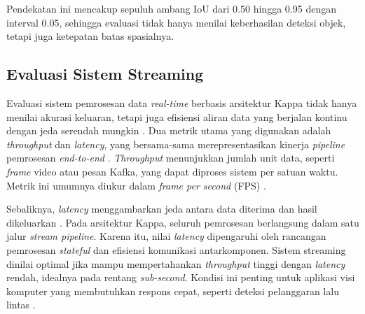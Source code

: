 Pendekatan ini mencakup sepuluh ambang IoU dari 0{.}50 hingga 0{.}95 dengan
interval 0{.}05, sehingga evaluasi tidak hanya menilai keberhasilan deteksi
objek, tetapi juga ketepatan batas spasialnya.
\subsection{Evaluasi Sistem Streaming}

Evaluasi sistem pemrosesan data \textit{real-time} berbasis arsitektur Kappa
tidak hanya menilai akurasi keluaran, tetapi juga efisiensi aliran data yang
berjalan kontinu dengan jeda serendah mungkin
\cite{kreps2014questioning}. Dua metrik utama yang digunakan adalah
\textit{throughput} dan \textit{latency}, yang bersama-sama merepresentasikan
kinerja \textit{pipeline} pemrosesan \textit{end-to-end}
\cite{kleppmann2017designing}. \textit{Throughput} menunjukkan jumlah unit
data, seperti \textit{frame} video atau pesan Kafka, yang dapat diproses
sistem per satuan waktu. Metrik ini umumnya diukur dalam
\textit{frame per second} (FPS) \cite{marz2015big}.

Sebaliknya, \textit{latency} menggambarkan jeda antara data diterima dan hasil
dikeluarkan \cite{kleppmann2017designing}. Pada arsitektur Kappa, seluruh
pemrosesan berlangsung dalam satu jalur \textit{stream pipeline}. Karena itu,
nilai \textit{latency} dipengaruhi oleh rancangan pemrosesan
\textit{stateful} dan efisiensi komunikasi antarkomponen. Sistem streaming
dinilai optimal jika mampu mempertahankan \textit{throughput} tinggi dengan
\textit{latency} rendah, idealnya pada rentang \textit{sub-second}. Kondisi
ini penting untuk aplikasi visi komputer yang membutuhkan respons cepat,
seperti deteksi pelanggaran lalu lintas \cite{kreps2014questioning}.
